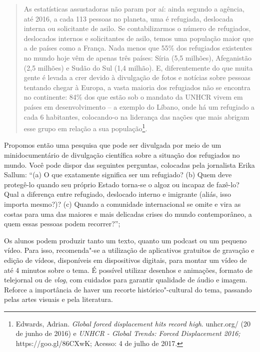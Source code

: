 \documentclass[12pt]{extarticle}
\begin{document}
\begin{itemize}
\begin{quote}
As estatísticas assustadoras não param por aí: ainda segundo a agência,
até 2016, a cada 113 pessoas no planeta, uma é refugiada, deslocada
interna ou solicitante de asilo. Se contabilizarmos o número de
refugiados, deslocados internos e solicitantes de asilo, temos uma
população maior que a de países como a França. Nada menos que 55\% dos
refugiados existentes no mundo hoje vêm de apenas três países: Síria (5,5 milhões),
Afeganistão (2,5 milhões) e Sudão do Sul (1,4 milhão). E, diferentemente do que muita gente é levada a
crer devido à divulgação de fotos e notícias sobre pessoas tentando
chegar à Europa, a vasta maioria dos refugiados não se encontra no
continente: 84\% dos que estão sob o mandato da {UNHCR} vivem em países em
desenvolvimento -- a exemplo do Líbano, onde há um refugiado a cada 6
habitantes, colocando-o na liderança das nações que mais abrigam esse
grupo em relação a sua população\footnote{Edwards, Adrian. \emph{Global forced
  displacement hits record high}.
  {unhcr.org/} (20 de
  junho de 2016) e \emph{{UNHCR} - Global Trends: Forced Displacement 2016;}
  https://goo.gl/86CXwK; Acesso: 4 
  de julho de 2017.}. 
\end{quote}



Propomos então uma pesquisa que pode ser divulgada por meio de
um minidocumentário de divulgação científica sobre a situação dos refugiados 
no mundo. Você pode dispor das seguintes perguntas, colocadas pela 
jornalista Erika Sallum: ``(a) O que exatamente significa ser um refugiado? 
(b) Quem deve protegê-lo quando seu próprio Estado torna-se o algoz ou incapaz de fazê-lo? Qual a
diferença entre refugiado, deslocado interno e imigrante (aliás, isso
importa mesmo?)? 
(c) Quando a comunidade internacional se omite e vira as
costas para uma das maiores e mais delicadas crises do mundo contemporâneo, a
quem essas pessoas podem recorrer?''; 

Os alunos podem produzir tanto um texto, quanto um podcast ou um pequeno vídeo.
Para isso, recomenda"-se a utilização de aplicativos gratuitos de
gravação e edição de vídeos, disponíveis em dispositivos digitais,
para montar um vídeo de até 4 minutos sobre o tema. É possível
utilizar desenhos e animações, formato de telejornal ou de
\emph{vlog}, com cuidados para garantir qualidade de áudio e imagem.
Reforce a importância de haver um recorte histórico"-cultural do tema,
passando pelas artes visuais e pela literatura.



\end{itemize}
\end{document}
